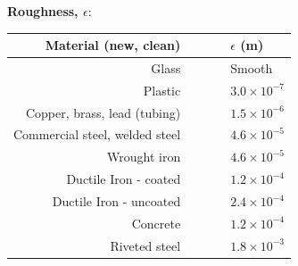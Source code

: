 \documentclass[10pt, onesided]{amsart}
\begin{document}
\begin{center}
	\begin{center}
		\textbf{Roughness, $\epsilon$}:
		\par\bigskip
		\begin{tabular}{rrl}
			\toprule
			Material (new, clean)          & $\qquad$ & $\epsilon$ (m)     \\
			\midrule
			\midrule
			Glass                          &          & Smooth             \\
			\midrule
			Plastic                        &          & $3.0\times10^{-7}$ \\
			\midrule
			Copper, brass, lead (tubing)   &          & $1.5\times10^{-6}$ \\
			\midrule
			Commercial steel, welded steel &          & $4.6\times10^{-5}$ \\
			\midrule
			Wrought iron                   &          & $4.6\times10^{-5}$ \\
			\midrule
			Ductile Iron - coated          &          & $1.2\times10^{-4}$ \\
			\midrule
			Ductile Iron - uncoated        &          & $2.4\times10^{-4}$ \\
			\midrule
			Concrete                       &          & $1.2\times10^{-4}$ \\
			\midrule
			Riveted steel                  &          & $1.8\times10^{-3}$ \\
			\midrule
			\bottomrule
		\end{tabular}
		\par\end{center}
	\end{center}
	
	
	\newpage
	\large
	
	
	\raggedright
	
	
\end{document}

